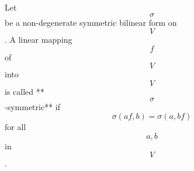 Let $$\sigma$$ be a non-degenerate symmetric bilinear form on $$V$$. A linear mapping $$f$$ of $$V$$ into $$V$$ is called **$$\sigma$$-symmetric** if
$$\sigma(af, b) = \sigma(a, bf)$$
for all $$a, b$$ in $$V$$.
